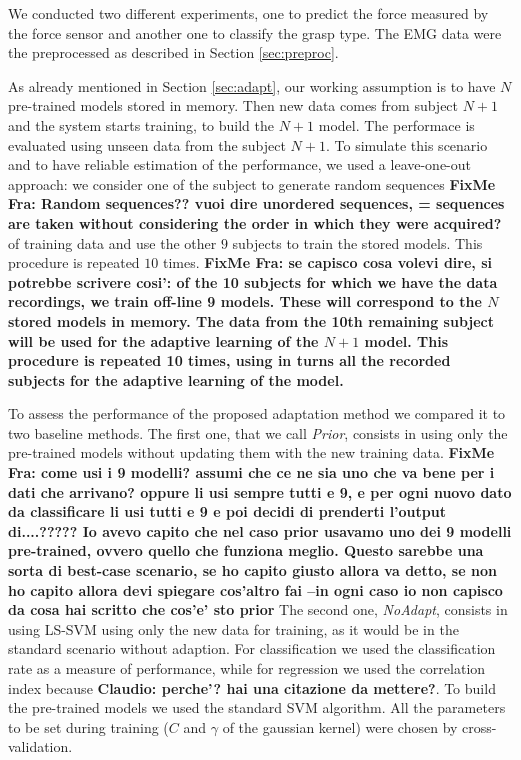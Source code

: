 We conducted two different experiments, one to predict the force measured
by the force sensor and another one to classify the grasp type.
The EMG data were the preprocessed as described in Section \ref{sec:preproc}.

As already mentioned in Section \ref{sec:adapt}, our working assumption is to have
 $N$ pre-trained models stored in memory.
Then new data comes from subject $N+1$ and the system starts
training, to build the $N+1$ model. 
The performace is evaluated using unseen data from the subject
$N+1$.
To simulate this scenario and to have reliable estimation of the
performance, we  used a leave-one-out approach: 
we consider one of the subject to generate random sequences
{\bf FixMe Fra: Random sequences?? vuoi dire unordered sequences, = sequences are taken without considering the order in which they were acquired?}
of training data and use the other $9$ subjects to train the stored models.
This procedure is repeated $10$ times.
{\bf FixMe Fra: se capisco cosa volevi dire, si potrebbe scrivere cosi':
of the 10 subjects for which we have the data recordings, we train off-line
9 models. These will correspond to the $N$ stored models in memory. The data from the 10th 
remaining subject will be used for the adaptive learning of the $N+1$ model. This procedure is repeated
10 times, using in turns all the recorded subjects for the adaptive learning of the model.
}


To assess the performance of the proposed adaptation method we  compared it
to two baseline methods. The first one, that we call \emph{Prior}, consists in
using only the pre-trained models without updating them with the new training data.
{\bf FixMe Fra: come usi i 9 modelli? assumi che ce ne sia uno che va bene per i dati che arrivano? oppure li usi sempre tutti e 9, e per ogni nuovo dato da classificare li usi
tutti e 9 e poi decidi di prenderti l'output di....????? Io avevo capito che nel caso prior usavamo uno dei 9 modelli pre-trained, ovvero quello che funziona meglio. Questo sarebbe
una sorta di best-case scenario, se ho capito giusto allora va detto, se non ho capito allora devi spiegare cos'altro fai --in ogni caso io non capisco
da cosa hai scritto che cos'e' sto prior}
The second one, \emph{NoAdapt}, consists in using LS-SVM using only the new data
for training, as it would be in the standard scenario without adaption.
For classification we used the classification rate as a measure of performance,
while for regression we used the correlation index because \textbf{Claudio: perche'?
hai una citazione da mettere?}.
To build the  pre-trained models we used the standard SVM algorithm. All the parameters to be set during %
training ($C$ and $\gamma$ of the gaussian kernel) were chosen by cross-validation.

